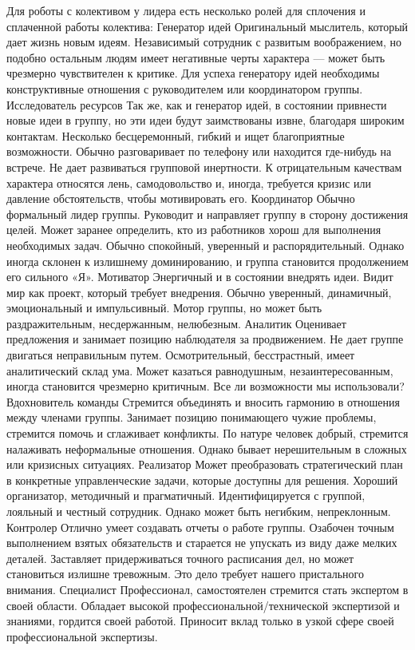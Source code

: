 \documentclass{../industrial-development}
\begin{document}
Для роботы с колективом у лидера есть несколько ролей для сплочения и сплаченной работы колектива:
Генератор идей
Оригинальный мыслитель, который дает жизнь новым идеям. Независимый сотрудник с развитым воображением, но подобно остальным людям имеет негативные черты характера — может быть чрезмерно чувствителен к критике. Для успеха генератору идей необходимы конструктивные отношения с руководителем или координатором группы.
Исследователь ресурсов
Так же, как и генератор идей, в состоянии привнести новые идеи в группу, но эти идеи будут заимствованы извне, благодаря широким контактам. Несколько бесцеремонный, гибкий и ищет благоприятные возможности. Обычно разговаривает по телефону или находится где-нибудь на встрече. Не дает развиваться групповой инертности. К отрицательным качествам характера относятся лень, самодовольство и, иногда, требуется кризис или давление обстоятельств, чтобы мотивировать его.
Координатор
Обычно формальный лидер группы. Руководит и направляет группу в сторону достижения целей. Может заранее определить, кто из работников хорош для выполнения необходимых задач. Обычно спокойный, уверенный и распорядительный. Однако иногда склонен к излишнему доминированию, и группа становится продолжением его сильного «Я».
Мотиватор
Энергичный и в состоянии внедрять идеи. Видит мир как проект, который требует внедрения. Обычно уверенный, динамичный, эмоциональный и импульсивный. Мотор группы, но может быть раздражительным, несдержанным, нелюбезным.
Аналитик
Оценивает предложения и занимает позицию наблюдателя за продвижением. Не дает группе двигаться неправильным путем. Осмотрительный, бесстрастный, имеет аналитический склад ума. Может казаться равнодушным, незаинтересованным, иногда становится чрезмерно критичным.	Все ли возможности мы использовали?
Вдохновитель команды
Стремится объединять и вносить гармонию в отношения между членами группы. Занимает позицию понимающего чужие проблемы, стремится помочь и сглаживает конфликты. По натуре человек добрый, стремится налаживать неформальные отношения. Однако бывает нерешительным в сложных или кризисных ситуациях.
Реализатор
Может преобразовать стратегический план в конкретные управленческие задачи, которые доступны для решения. Хороший организатор, методичный и прагматичный. Идентифицируется с группой, лояльный и честный сотрудник. Однако может быть негибким, непреклонным.
Контролер
Отлично умеет создавать отчеты о работе группы. Озабочен точным выполнением взятых обязательств и старается не упускать из виду даже мелких деталей. Заставляет придерживаться точного расписания дел, но может становиться излишне тревожным.	Это дело требует нашего пристального внимания.
Специалист
Профессионал, самостоятелен стремится стать экспертом в своей области. Обладает высокой профессиональной/технической экспертизой и знаниями, гордится своей работой. Приносит вклад только в узкой сфере своей профессиональной экспертизы.
\end{document}
